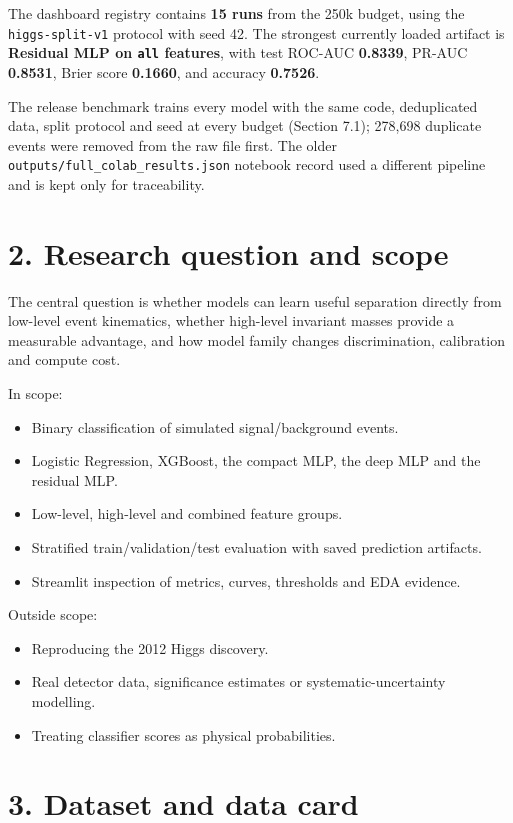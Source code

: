 \documentclass[11pt,a4paper,oneside]{report}
\begin{document}
The dashboard registry contains \textbf{15 runs} from the 250k budget, using the \texttt{higgs-split-v1} protocol with seed 42. The strongest currently loaded artifact is \textbf{Residual MLP on \texttt{all} features}, with test ROC-AUC \textbf{0.8339}, PR-AUC \textbf{0.8531}, Brier score \textbf{0.1660}, and accuracy \textbf{0.7526}. 

The release benchmark trains every model with the same code, deduplicated data, split protocol and seed at every budget (Section 7.1); 278,698 duplicate events were removed from the raw file first. The older \texttt{outputs/full\_colab\_results.json} notebook record used a different pipeline and is kept only for traceability.

\section{2. Research question and scope}

The central question is whether models can learn useful separation directly from low-level event kinematics, whether high-level invariant masses provide a measurable advantage, and how model family changes discrimination, calibration and compute cost.

In scope:

\begin{itemize}
\item Binary classification of simulated signal/background events.
\item Logistic Regression, XGBoost, the compact MLP, the deep MLP and the residual MLP.
\item Low-level, high-level and combined feature groups.
\item Stratified train/validation/test evaluation with saved prediction artifacts.
\item Streamlit inspection of metrics, curves, thresholds and EDA evidence.
\end{itemize}

Outside scope:

\begin{itemize}
\item Reproducing the 2012 Higgs discovery.
\item Real detector data, significance estimates or systematic-uncertainty modelling.
\item Treating classifier scores as physical probabilities.
\end{itemize}

\section{3. Dataset and data card}
\end{document}
